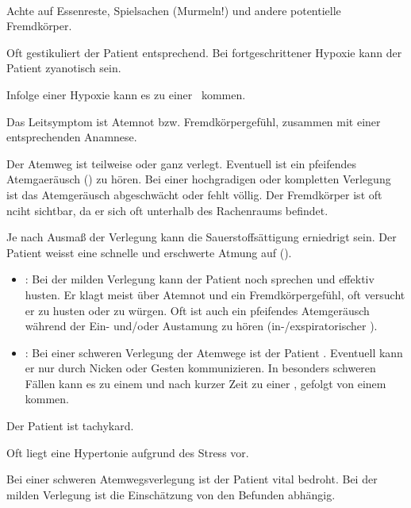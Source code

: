 
{\TxABCDE}
{~
\begin{ABCDEText}
  \item[\ABCDE{1}] Achte auf Essenreste, Spielsachen
  (Murmeln!) und andere potentielle Fremdkörper.
  \item[\ABCDE{2}] Oft gestikuliert der Patient
  entsprechend. Bei fortgeschrittener Hypoxie kann der
  Patient zyanotisch sein.
  \item[\ABCDE{3}] Infolge einer Hypoxie
  kann es zu einer {\RedFlag}\, kommen.
  \item[\ABCDE{4}] Das Leitsymptom ist Atemnot bzw.
  Fremdkörpergefühl, zusammen mit einer entsprechenden
  Anamnese.
  \item[\ABCDE{A}] Der Atemweg ist teilweise oder ganz
  verlegt. Eventuell ist ein pfeifendes Atemgaeräusch
  () zu hören. Bei einer hochgradigen
  oder kompletten Verlegung ist das Atemgeräusch
  abgeschwächt oder fehlt völlig. Der Fremdkörper ist oft
  nciht sichtbar, da er sich oft unterhalb des Rachenraums
  befindet. 
  \item[\ABCDE{B}] Je nach Ausmaß der Verlegung kann die
  Sauerstoffsättigung erniedrigt sein. Der Patient weisst
  eine schnelle und erschwerte Atmung auf ().
  \begin{itemize}
  \item {}: Bei
  der milden Verlegung kann der Patient noch sprechen und effektiv husten. Er klagt
  meist über Atemnot und ein Fremdkörpergefühl, oft versucht er zu husten
  oder zu würgen. Oft ist auch ein pfeifendes Atemgeräusch
  während der Ein- und/oder Austamung zu hören
  (in-/exspiratorischer ).
  \item {}:
  Bei einer schweren Verlegung der Atemwege ist der Patient
  . Eventuell kann
  er nur durch Nic\-k\-en oder Gesten kommunizieren. In besonders
  schweren Fällen kann es zu einem  und nach
  kurzer Zeit zu einer , gefolgt von einem
   kommen.
\end{itemize}
  \item[\ABCDE{C}] Der Patient ist tachykard.
  \item[\ABCDE{D}] Oft liegt eine Hypertonie aufgrund des
  Stress vor. 
  \item[\ABCDE{=}] Bei einer schweren Atemwegsverlegung ist
  der Patient vital bedroht. Bei der milden Verlegung ist
  die Einschätzung von den Befunden abhängig.
\end{ABCDEText}
}
